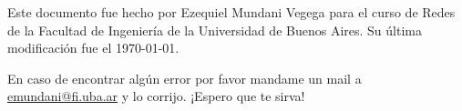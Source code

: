 \begin{center}
    \huge \thetitle
\end{center}

Este documento fue hecho por Ezequiel Mundani Vegega para el curso de Redes de la Facultad de Ingeniería de la Universidad de Buenos Aires. Su última modificación fue el \today.

\skipline
En caso de encontrar algún error por favor mandame un mail a {\color{blue}\href{mailto:emundani@fi.uba.ar}{emundani@fi.uba.ar}} y lo corrijo. ¡Espero que te sirva!
